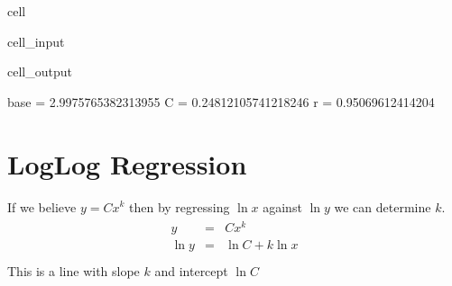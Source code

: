 \documentclass[letterpaper,10pt,english]{jupyterBook}
\begin{document}
\begin{sphinxuseclass}{cell}\begin{sphinxVerbatimInput}

\begin{sphinxuseclass}{cell_input}
\begin{sphinxVerbatim}[commandchars=\\\{\}]
  
 
\PYG{p}{[}\PYG{p}{]}
\end{sphinxVerbatim}

\end{sphinxuseclass}\end{sphinxVerbatimInput}
\begin{sphinxVerbatimOutput}

\begin{sphinxuseclass}{cell_output}
\begin{sphinxVerbatim}[commandchars=\\\{\}]
base =  2.9975765382313955
C =  0.24812105741218246
r = 0.95069612414204
\end{sphinxVerbatim}

\end{sphinxuseclass}\end{sphinxVerbatimOutput}

\end{sphinxuseclass}

\section{Log\sphinxhyphen{}Log Regression}
\label{\detokenize{lessons/LogLogRegression:id1}}
\sphinxAtStartPar
If we believe \(y = Cx^k\) then by regressing \(\ln x\) against \(\ln y\) we can determine \(k\).
\begin{equation*}
\begin{split}
\begin{array}{rl}
y &=& Cx^k \\
\ln y &=& \ln C + k \ln x \\
\end{array}
\end{split}
\end{equation*}
\sphinxAtStartPar
This is a line with slope \(k\) and intercept \(\ln C\)
\end{document}
